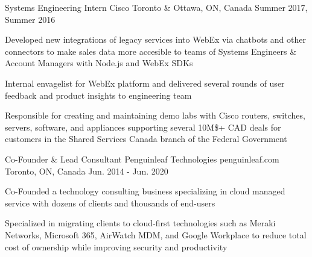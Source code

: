 \begin{cventries}
  \cventry
    {Systems Engineering Intern} %
    {Cisco} %
    {} %
    {Toronto \& Ottawa, ON, Canada} %
    {Summer 2017, Summer 2016} %
    {
      \begin{cvitems} %
        \item {Developed new integrations of legacy services into WebEx via chatbots and other connectors to make sales data more accesible to teams of Systems Engineers \& Account Managers with Node.js and WebEx SDKs}
        \item {Internal envagelist for WebEx platform and delivered several rounds of user feedback and product insights to engineering team}
        \item {Responsible for creating and maintaining demo labs with Cisco routers, switches, servers, software, and appliances supporting several 10M\$+ CAD deals for customers in the Shared Services Canada branch of the Federal Government}
      \end{cvitems}
    }

  \cventry
    {Co-Founder \& Lead Consultant} %
    {Penguinleaf Technologies} %
    {penguinleaf.com} %
    {Toronto, ON, Canada} %
    {Jun. 2014 - Jun. 2020} %
    {
      \begin{cvitems} %
        \item {Co-Founded a technology consulting business specializing in cloud managed service with dozens of clients and thousands of end-users}
        \item {Specialized in migrating clients to cloud-first technologies such as Meraki Networks, Microsoft 365, AirWatch MDM, and Google Workplace to reduce total cost of ownership while improving security and productivity}
      \end{cvitems}
    }

\end{cventries}
